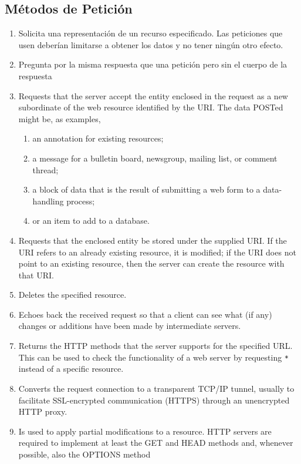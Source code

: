 \subsection{Métodos de Petición}
\label{subsection:metodosdepeticionhttp}
\begin{enumerate}
\item {}

Solicita una representación de un recurso especificado.
Las peticiones que usen  deberían limitarse a obtener los datos 
y no tener ningún otro efecto.
\item {}

Pregunta por la misma respuesta que una petición  pero sin el 
cuerpo de la respuesta
\item {}

Requests that the server accept the entity enclosed in the request
as a new subordinate of the web resource identified by the URI. The
data POSTed might be, as examples, 
  \begin{enumerate}
  \item 
  an annotation for existing
  resources; 
  \item 
  a message for a bulletin board, newsgroup, mailing list,
  or comment thread; 
  \item 
  a block of data that is the result of submitting
  a web form to a data-handling process; 
  \item 
  or an item to add to a
  database.
  \end{enumerate}
\item {}

Requests that the enclosed entity be stored under the supplied URI.
If the URI refers to an already existing resource, it is modified;
if the URI does not point to an existing resource, then the server
can create the resource with that URI.
\item {}

Deletes the specified resource.
\item {}

Echoes back the received request so that a client can see what (if
any) changes or additions have been made by intermediate servers.
\item {}

Returns the HTTP methods that the server supports for the specified
URL. This can be used to check the functionality of a web server
by requesting \verb'*' instead of a specific resource.
\item {}

Converts the request connection to a transparent TCP/IP tunnel,
usually to facilitate SSL-encrypted communication (HTTPS) through
an unencrypted HTTP proxy.
\item {}

Is used to apply partial modifications to a resource.
HTTP servers are required to implement at least the GET and HEAD
methods and, whenever possible, also the OPTIONS method
\end{enumerate}


